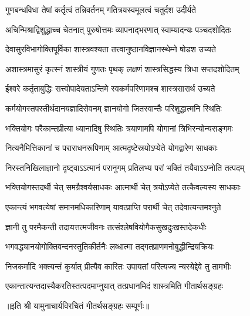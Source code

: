 \twolineshloka
{गुणबन्धविधा तेषां कर्तृत्वं तन्निवर्तनम्}
{गतित्रयस्वमूलत्वं चतुर्दश उदीर्यते}

\twolineshloka
{अचिन्मिश्राद्विशुद्धाच्च चेतनात् पुरुषोत्तमः}
{व्यापनाद्भरणात् स्वाम्यादन्यः पञ्चदशोदितः}

\twolineshloka
{देवासुरविभागोक्तिपूर्विका शास्त्रवश्यता}
{तत्त्वानुष्ठानविज्ञानस्थेम्ने षोडश उच्यते}

\twolineshloka
{अशास्त्रमासुरं कृत्स्नं शास्त्रीयं गुणतः पृथक्}
{लक्षणं शास्त्रसिद्धस्य त्रिधा सप्तदशोदितम्}

\twolineshloka
{ईश्वरे कर्तृताबुद्धिः सत्त्वोपादेयताऽन्तिमे}
{स्वकर्मपरिणामश्च शास्त्रसारार्थ उच्यते}

\twolineshloka
{कर्मयोगस्तपस्तीर्थदानयज्ञादिसेवनम्}
{ज्ञानयोगो जितस्वान्तैः परिशुद्धात्मनि स्थितिः}

\twolineshloka
{भक्तियोगः परैकान्तप्रीत्या ध्यानादिषु स्थितिः}
{त्रयाणामपि योगानां त्रिभिरन्योन्यसङ्गमः}

\twolineshloka
{नित्यनैमित्तिकानां च पराराधनरूपिणाम्}
{आत्मदृष्टेस्रयोऽप्येते योगद्वारेण साधकाः}

\twolineshloka
{निरस्तनिखिलाज्ञानो दृष्ट्वाऽऽत्मानं परानुगम्}
{प्रतिलभ्य परां भक्तिं तयैवाऽऽप्नोति तत्पदम्}

\twolineshloka
{भक्तियोगस्तदर्थी चेत् समग्रैश्वर्यसाधकः}
{आत्मार्थी चेत् त्रयोऽप्येते तत्कैवल्यस्य साधकाः}

\twolineshloka
{एकान्त्यं भगवत्येषां समानमधिकारिणाम्}
{यावत्प्राप्ति परार्थी चेत् तदेवात्यन्तमश्नुते}

\twolineshloka
{ज्ञानी तु परमैकन्ती तदायत्तत्मजीवनः}
{तत्संश्लेषवियोगैकसुखदुःखस्तदेकधीः}

\twolineshloka
{भगवद्\mbox{}ध्यानयोगोक्तिवन्दनस्तुतिकीर्तनैः}
{लब्धात्मा तद्गतप्राणमनोबुद्धीन्द्रियक्रियः}

\twolineshloka
{निजकर्मादि भक्त्यन्तं कुर्यात् प्रीत्यैव कारितः}
{उपायतां परित्यज्य न्यस्येद्देवे तु तामभीः}

\twolineshloka
{एकान्तात्यन्तदास्यैकरतिस्तत्पदमाप्नुयात्}
{तत्प्रधानमिदं शास्त्रमिति गीतार्थसङ्ग्रहः}

॥इति श्री यामुनाचार्यविरचितं गीतर्थसङ्ग्रहः सम्पूर्णः॥
